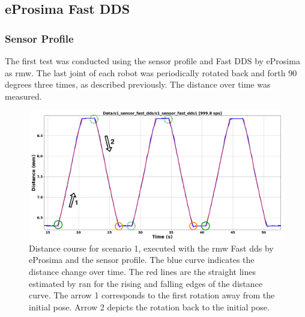\subsection{eProsima Fast DDS}
\subsubsection{Sensor Profile}
The first test was conducted using the sensor profile and Fast DDS by eProsima as \gls{rmw}. The last joint of each robot was periodically rotated back and forth 90 degrees three times, as described previously. The distance over time was measured.\newline
\begin{figure}[H]
	\centering
	\includegraphics[width=1\textwidth]{Figures/c6/s1/s1_sensor_fast_dds.png}
	\caption{Distance course for scenario 1, executed with the \gls{rmw} Fast \gls{dds} by eProsima and the sensor profile. The blue curve indicates the distance change over time. The red lines are the straight lines estimated by \gls{ran} for the rising and falling edges of the distance curve. The arrow 1 corresponds to the first rotation away from the initial pose. Arrow 2 depicts the rotation back to the initial pose.}
	\label{c6_fig_test_s1_sensor_fast_dds}
\end{figure}
